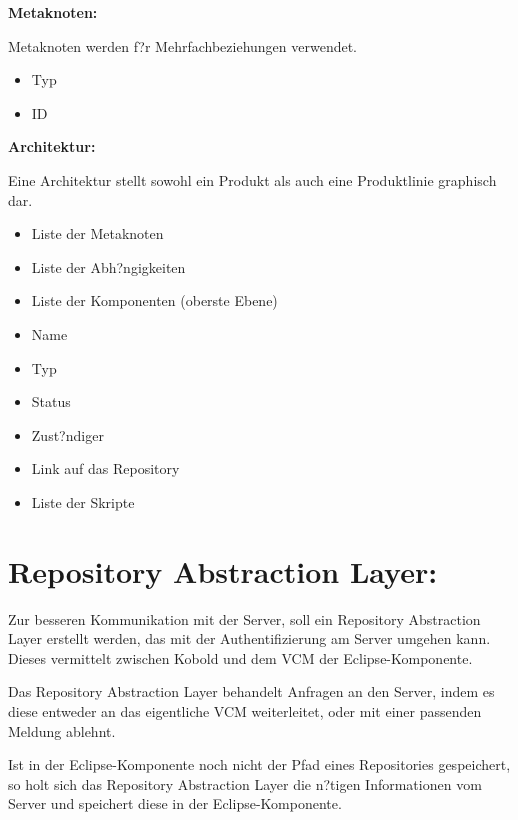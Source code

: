 \textbf{Metaknoten:}\par
Metaknoten werden f?r Mehrfachbeziehungen verwendet.
\begin{itemize}
\item Typ
\item ID\newline
\end{itemize}

\textbf{Architektur:}\par
Eine Architektur stellt sowohl ein Produkt als auch eine Produktlinie graphisch dar.
\begin{itemize}
\item Liste der Metaknoten
\item Liste der Abh?ngigkeiten
\item Liste der Komponenten (oberste Ebene)
\item Name
\item Typ
\item Status
\item Zust?ndiger
\item Link auf das Repository
\item Liste der Skripte
\end{itemize}


\section{Repository Abstraction Layer:}

Zur besseren Kommunikation mit der Server, soll ein Repository Abstraction Layer erstellt werden, das mit der Authentifizierung am Server umgehen kann. Dieses vermittelt zwischen Kobold und dem VCM der Eclipse-Komponente.\newline

Das Repository Abstraction Layer behandelt Anfragen an den Server, indem es diese entweder an das eigentliche VCM weiterleitet, oder mit einer passenden Meldung ablehnt.\par
Ist in der Eclipse-Komponente noch nicht der Pfad eines Repositories gespeichert, so holt sich das Repository Abstraction Layer die n?tigen Informationen vom Server und speichert diese in der Eclipse-Komponente.


